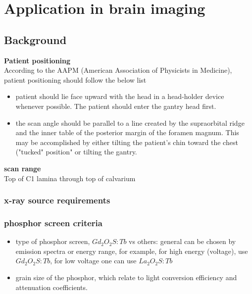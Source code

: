 \chapter{Application in brain imaging}
\label{chap:brain_imaging}

\section{Background}

\noindent \textbf{Patient positioning} \\
\noindent According to the AAPM (American Association of Physicists in Medicine), patient positioning should follow the below list\citep{aapm_headCT2012}
\begin{itemize}
\item patient should lie face upward with the head in a head-holder device whenever possible.  The patient should enter the gantry head first.
\item the scan angle should be parallel to a line created by the supraorbital ridge and the inner table of the posterior margin of the foramen magnum.  This may be accomplished by either tilting the patient's chin toward the chest ("tucked" position" or tilting the gantry.
\end{itemize}

\noindent \textbf{scan range} \\
\noindent Top of C1 lamina through top of calvarium \\

\subsection{x-ray source requirements}
\subsection{phosphor screen criteria}

\begin{itemize}
\item type of phosphor screen, $Gd_2O_2S:Tb$ vs others: general can be chosen by emission spectra or energy range, for example, for high energy (voltage), use $Gd_2O_2S:Tb$, for low voltage one can use $La_2O_2S:Tb$ \cite{Kandarakis2001}

\item grain size of the phosphor, which relate to light conversion efficiency and attenuation coefficients.

\end{itemize}


